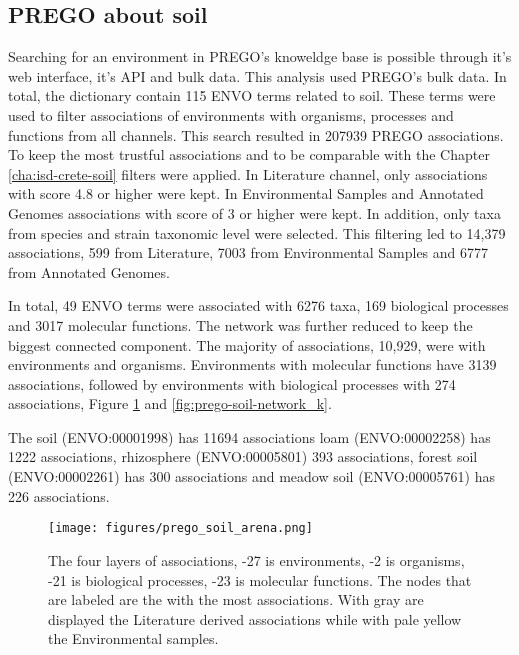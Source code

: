    \subsection{PREGO about soil}
   \label{subsec:prego-soil}

Searching for an environment in PREGO's knoweldge base is possible through
it's web interface, it's API and bulk data. This analysis used PREGO's bulk data. 
In total, the dictionary contain 115 ENVO terms related to soil. These terms were
used to filter associations of environments with organisms, processes and functions 
from all channels. This search resulted in 207939 PREGO associations. 
To keep the most trustful associations and to be comparable with the Chapter \ref{cha:isd-crete-soil}
filters were applied. In Literature channel, only associations with score 4.8 or higher were kept. 
In Environmental Samples and Annotated Genomes associations with score of 3 or higher were kept. 
In addition, only taxa from species and strain taxonomic level were selected.
This filtering led to 14,379 associations, 599 from Literature, 7003 from Environmental
Samples and 6777 from Annotated Genomes.

In total, 49 ENVO terms were associated with 6276 taxa, 169 biological processes
and 3017 molecular functions. The network was further reduced to keep the 
biggest connected component. 
The majority of associations, 10,929, were with environments and organisms.
Environments with molecular functions have 3139 associations, followed by 
environments with biological processes with 274 associations, Figure \ref{fig:prego-soil-network} and \ref{fig:prego-soil-network_k}.

The soil (ENVO:00001998) has 11694 associations
loam (ENVO:00002258) has 1222 associations,
rhizosphere (ENVO:00005801) 393 associations,
forest soil (ENVO:00002261) has 300 associations and
meadow soil (ENVO:00005761) has 226 associations.

   \begin{figure}[hbt!]
      \centering
      \texttt{[image: figures/prego\_soil\_arena.png]}
      \caption[PREGO soil network of literature and environmental samples]{
         The four layers of associations, -27 is environments, -2 is organisms, -21 is biological processes, -23 is molecular functions. The nodes that are labeled are the with the most associations. With gray are displayed the Literature derived associations while with pale yellow the Environmental samples. }
      \label{fig:prego-soil-network}
   \end{figure}
   

